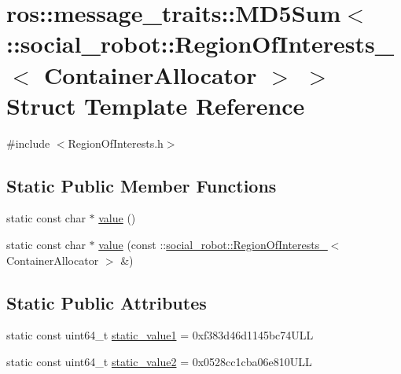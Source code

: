 \hypertarget{structros_1_1message__traits_1_1MD5Sum_3_01_1_1social__robot_1_1RegionOfInterests___3_01ContainerAllocator_01_4_01_4}{
\section{ros::message\_\-traits::MD5Sum$<$ ::social\_\-robot::RegionOfInterests\_\-$<$ ContainerAllocator $>$ $>$ Struct Template Reference}
\label{structros_1_1message__traits_1_1MD5Sum_3_01_1_1social__robot_1_1RegionOfInterests___3_01ContainerAllocator_01_4_01_4}
}


{\ttfamily \#include $<$RegionOfInterests.h$>$}

\subsection*{Static Public Member Functions}
\begin{DoxyCompactItemize}
\item 
static const char $\ast$ \hyperlink{structros_1_1message__traits_1_1MD5Sum_3_01_1_1social__robot_1_1RegionOfInterests___3_01ContainerAllocator_01_4_01_4_a67994b4181cbea5a65fb049951814fa6}{value} ()
\item 
static const char $\ast$ \hyperlink{structros_1_1message__traits_1_1MD5Sum_3_01_1_1social__robot_1_1RegionOfInterests___3_01ContainerAllocator_01_4_01_4_a0250fe5254b1e1c56322d0de2ba977dc}{value} (const ::\hyperlink{structsocial__robot_1_1RegionOfInterests__}{social\_\-robot::RegionOfInterests\_\-}$<$ ContainerAllocator $>$ \&)
\end{DoxyCompactItemize}
\subsection*{Static Public Attributes}
\begin{DoxyCompactItemize}
\item 
static const uint64\_\-t \hyperlink{structros_1_1message__traits_1_1MD5Sum_3_01_1_1social__robot_1_1RegionOfInterests___3_01ContainerAllocator_01_4_01_4_afdf715607f94e9813124b1ef2e644f89}{static\_\-value1} = 0xf383d46d1145bc74ULL
\item 
static const uint64\_\-t \hyperlink{structros_1_1message__traits_1_1MD5Sum_3_01_1_1social__robot_1_1RegionOfInterests___3_01ContainerAllocator_01_4_01_4_ab6022a7120718d5b35a604cccdbd3f03}{static\_\-value2} = 0x0528cc1cba06e810ULL
\end{DoxyCompactItemize}
